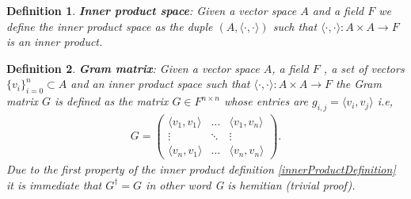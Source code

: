 \documentclass[12pt,letterpaper]{article}
\newtheorem{definition}{Definition}
\begin{document}
\begin{multicols}{2}
\begin{definition}
\textbf{Inner product space}: Given a vector space $A$ and a field $F$ we define the  inner product space as the duple $(A,\langle \cdot , \cdot \rangle)$ such that  $\langle \cdot , \cdot \rangle:A\times A\rightarrow F$ is an inner product.
\end{definition}

\begin{definition}\label{defGramMatrix}
\textbf{Gram matrix}: Given a vector space $A$, a field $F$ , a set of vectors $\{v_i\}_{i=0}^n\subset A$ and an inner product space such that  $\langle \cdot , \cdot \rangle:A\times A\rightarrow F$  the Gram matrix $G$ is defined as the matrix $G\in F^{n\times n}$ whose entries are $g_{i,j}=\langle v_i,v_j\rangle$ i.e,
\begin{align}
G=\begin{pmatrix}
\langle v_1,v_1\rangle & \hdots & \langle v_1,v_n\rangle\\
\vdots & \ddots & \vdots\\
\langle v_n,v_1\rangle & \hdots & \langle v_n,v_n\rangle
\end{pmatrix}.
\end{align}
Due to the first property of the inner product definition \ref{innerProductDefinition} it is immediate that $G^\dagger =G$ in other word G is hemitian (trivial proof).
\end{definition}

\end{multicols}
\newpage
\end{document}
